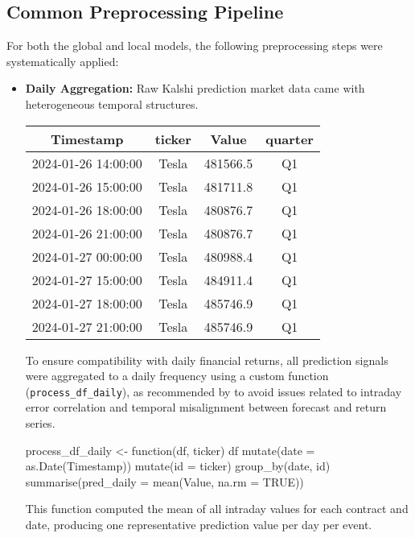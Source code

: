 \documentclass[12pt]{report}
\begin{document}
\subsection{Common Preprocessing Pipeline}
For both the global and local models, the following preprocessing steps were systematically applied:

\begin{itemize}
    \item \textbf{Daily Aggregation:} Raw Kalshi prediction market data came with heterogeneous temporal structures. 
    
    \vspace{10pt}  %

    \begin{center}
    \begin{tabular}{|c|c|c|c|}
    \hline
    \textbf{Timestamp} & \textbf{ticker} & \textbf{Value} & \textbf{quarter} \\
    \hline
    2024-01-26 14:00:00 & Tesla & 481566.5 & Q1 \\
    2024-01-26 15:00:00 & Tesla & 481711.8 & Q1 \\
    2024-01-26 18:00:00 & Tesla & 480876.7 & Q1 \\
    2024-01-26 21:00:00 & Tesla & 480876.7 & Q1 \\
    2024-01-27 00:00:00 & Tesla & 480988.4 & Q1 \\
    2024-01-27 15:00:00 & Tesla & 484911.4 & Q1 \\
    2024-01-27 18:00:00 & Tesla & 485746.9 & Q1 \\
    2024-01-27 21:00:00 & Tesla & 485746.9 & Q1 \\
    \hline
    \end{tabular}
    \end{center}
    
    To ensure compatibility with daily financial returns, all prediction signals were aggregated to a daily frequency using a custom function (\texttt{process\_df\_daily}), as recommended by \cite{campbell1997econometrics} to avoid issues related to intraday error correlation and temporal misalignment between forecast and return series.

    
    \begin{code}[language=R,caption={Test de causalité de Granger entre les séries}]
    process_df_daily <- function(df, ticker) {
    df %
        mutate(date = as.Date(Timestamp)) %
        mutate(id = ticker) %
        group_by(date, id) %
        summarise(pred_daily = mean(Value, na.rm = TRUE))
    }
    \end{code}
    This function computed the mean of all intraday values for each contract and date, producing one representative prediction value per day per event.




\end{itemize}
\end{document}
